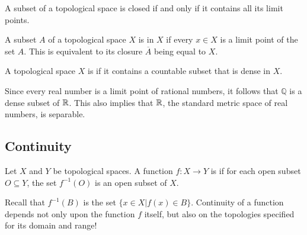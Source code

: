 \begin{theorem}
A subset of a topological space is closed if and only if it contains all its limit points.
\end{theorem}

\begin{definition}
A subset $A$ of a topological space $X$ is  in $X$ if every $x\in X$ is a limit point of the set $A$.
This is equivalent to its closure $\overline{A}$ being equal to $X$.
\end{definition}

\begin{definition}
A topological space $X$ is  if it contains a countable subset that is dense in $X$.
\end{definition}

\begin{example}
Since every real number is a limit point of rational numbers, it follows that $\mathbb{Q}$ is a dense subset of $\mathbb{R}$.
This also implies that $\mathbb{R}$, the standard metric space of real numbers, is separable.
\end{example}


\subsection{Continuity}

\begin{definition}
Let $X$ and $Y$ be topological spaces.
A function $f \colon X \rightarrow Y$ is  if for each open subset $O \subseteq Y$, the set $f^{-1} (O)$ is an open subset of $X$.
\end{definition}

Recall that $f^{-1}(B)$ is the set $\{ x \in X | f(x) \in B \}$.
Continuity of a function depends not only upon the function $f$ itself, but also on the topologies specified for its domain and range!

